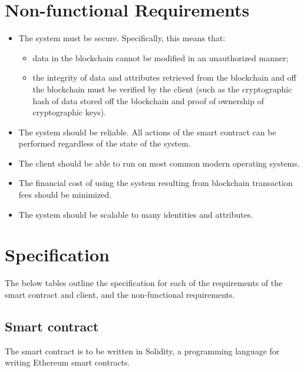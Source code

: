 \documentclass[a4paper]{report}
\begin{document}
	\section{Non-functional Requirements}
	\begin{itemize}
		\item The system must be secure. Specifically, this means that:
			\begin{itemize}
				\item data in the blockchain cannot be modified in an unauthorized manner;
				\item the integrity of data and attributes retrieved from the blockchain and off the blockchain must be verified by the client (such as the cryptographic hash of data stored off the blockchain and proof of ownership of cryptographic keys).
			\end{itemize}
		\item The system should be reliable. All actions of the smart contract can be performed regardless of the state of the system.
		\item The client should be able to run on most common modern operating systems.
		\item The financial cost of using the system resulting from blockchain transaction fees should be minimized.
		\item The system should be scalable to many identities and attributes.
	\end{itemize}
	
	\section{Specification}
	The below tables outline the specification for each of the requirements of the smart contract and client, and the non-functional requirements.	
	
	\subsection{Smart contract}
	The smart contract is to be written in Solidity, a programming language for writing Ethereum smart contracts.
	
\end{document}
